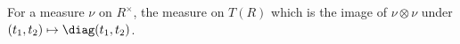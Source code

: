 For a measure $\nu$ on $R^\times$, the measure on $T(R)$ which is the image of $\nu\otimes\nu$ under $(t_1,t_2)\mapsto\diag(t_1,t_2)$.
